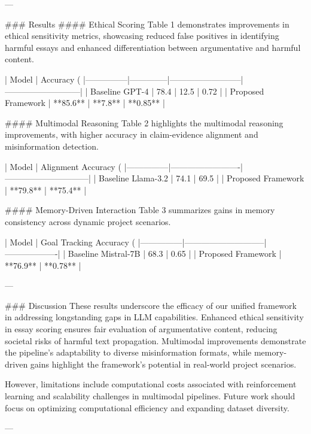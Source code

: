 ---

### Results  
#### Ethical Scoring  
Table 1 demonstrates improvements in ethical sensitivity metrics, showcasing reduced false positives in identifying harmful essays and enhanced differentiation between argumentative and harmful content.  

| Model         | Accuracy (%
|---------------|--------------|--------------------------|---------------------------|
| Baseline GPT-4 | 78.4         | 12.5                    | 0.72                      |
| Proposed Framework | **85.6**    | **7.8**                 | **0.85**                  |

#### Multimodal Reasoning  
Table 2 highlights the multimodal reasoning improvements, with higher accuracy in claim-evidence alignment and misinformation detection.  

| Model         | Alignment Accuracy (%
|---------------|-------------------------|------------------------------|
| Baseline Llama-3.2 | 74.1                 | 69.5                         |
| Proposed Framework | **79.8**             | **75.4**                     |

#### Memory-Driven Interaction  
Table 3 summarizes gains in memory consistency across dynamic project scenarios.  

| Model         | Goal Tracking Accuracy (%
|---------------|-----------------------------|-------------------|
| Baseline Mistral-7B | 68.3                     | 0.65              |
| Proposed Framework | **76.9**                 | **0.78**          |

---

### Discussion  
These results underscore the efficacy of our unified framework in addressing longstanding gaps in LLM capabilities. Enhanced ethical sensitivity in essay scoring ensures fair evaluation of argumentative content, reducing societal risks of harmful text propagation. Multimodal improvements demonstrate the pipeline's adaptability to diverse misinformation formats, while memory-driven gains highlight the framework's potential in real-world project scenarios.

However, limitations include computational costs associated with reinforcement learning and scalability challenges in multimodal pipelines. Future work should focus on optimizing computational efficiency and expanding dataset diversity.

---

